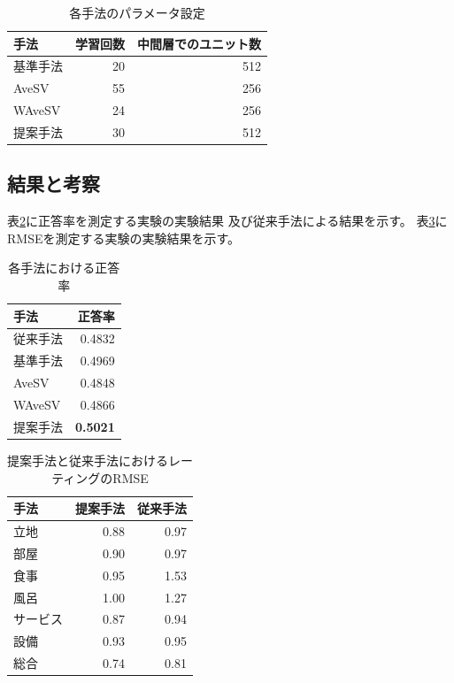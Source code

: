 \documentclass[twocolumn,a4paper]{ltjarticle}
\begin{document}
\begin{table}[b]
  \caption{各手法のパラメータ設定}
  \centering
  \begin{tabular}{l | r r} \label{tab:ParametersOfMethods}
    手法 & 学習回数 & 中間層でのユニット数 \\
    \hline
    基準手法  & 20 & 512 \\
    AveSV & 55 & 256 \\
    WAveSV & 24 & 256 \\
    提案手法 & 30 & 512 \\
  \end{tabular}
\end{table}


\subsection{結果と考察}

表\ref{tab:Accuracies}に正答率を測定する実験の実験結果
及び従来手法\cite{fujitani15}による結果を示す。
表\ref{tab:RMSEs}にRMSEを測定する実験の実験結果を示す。

\begin{table}[b]
  \caption{各手法における正答率}
  \centering
  \begin{tabular}{l | r} \label{tab:Accuracies}
    手法 & 正答率 \\
    \hline
    従来手法\cite{fujitani15}  & 0.4832 \\
    基準手法  & 0.4969 \\
    AveSV & 0.4848 \\
    WAveSV & 0.4866 \\
    提案手法 & \textbf{0.5021} \\
  \end{tabular}
\end{table}

\begin{table}[b]
  \caption{提案手法と従来手法\cite{fujitani15}におけるレーティングのRMSE}
  \centering
  \begin{tabular}{l | r r} \label{tab:RMSEs}
    手法 & 提案手法 & 従来手法\cite{fujitani15} \\
    \hline
    立地      & 0.88 & 0.97 \\
    部屋      & 0.90 & 0.97 \\
    食事      & 0.95 & 1.53 \\
    風呂      & 1.00 & 1.27 \\
    サービス  & 0.87 & 0.94 \\
    設備      & 0.93 & 0.95 \\
    総合      & 0.74 & 0.81 \\
  \end{tabular}
\end{table}
\end{document}
